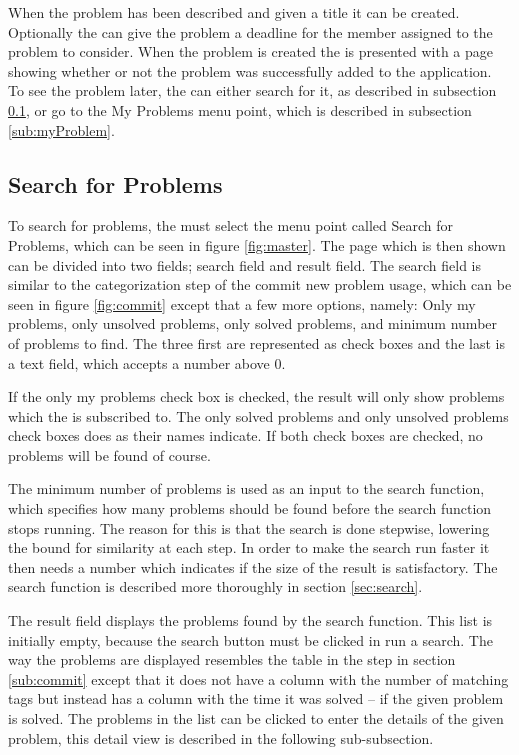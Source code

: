 When the problem has been described and given a title it can be created.
Optionally the \aclient[] can give the problem a deadline for the \astaff[] member assigned to the problem to consider.
When the problem is created the \aclient[] is presented with a page showing whether or not the problem was successfully added to the application.
To see the problem later, the \aclient[] can either search for it, as described in subsection \ref{sub:searchUsage}, or go to the My Problems menu point, which is described in subsection \ref{sub:myProblem}.

\subsection{Search for Problems}
\label{sub:searchUsage}
To search for problems, the \aclient[] must select the menu point called Search for Problems, which can be seen in figure \ref{fig:master}.
The page which is then shown can be divided into two fields; search field and result field.
The search field is similar to the categorization step of the commit new problem usage, which can be seen in figure \ref{fig:commit} except that a few more options, namely: Only my problems, only unsolved problems, only solved problems, and minimum number of problems to find.
The three first are represented as check boxes and the last is a text field, which accepts a number above 0.

If the only my problems check box is checked, the result will only show problems which the \aclient[] is subscribed to.
The only solved problems and only unsolved problems check boxes does as their names indicate.
If both check boxes are checked, no problems will be found of course.

The minimum number of problems is used as an input to the search function, which specifies how many problems should be found before the search function stops running.
The reason for this is that the search is done stepwise, lowering the bound for similarity at each step.
In order to make the search run faster it then needs a number which indicates if the size of the result is satisfactory.
The search function is described more thoroughly in section \ref{sec:search}.

The result field displays the problems found by the search function.
This list is initially empty, because the search button must be clicked in run a search.
The way the problems are displayed resembles the table in the  step in section \ref{sub:commit} except that it does not have a column with the number of matching tags but instead has a column with the time it was solved -- if the given problem is solved.
The problems in the list can be clicked to enter the details of the given problem, this detail view is described in the following sub-subsection.

